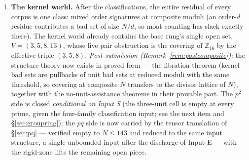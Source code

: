 \documentclass[11pt,a4paper]{article}
\numberwithin{equation}{section}
\theoremstyle{plain}
\theoremstyle{plain}
\theoremstyle{definition}
\theoremstyle{remark}
\newcommand{\Z}{\mathbb{Z}}
\begin{document}
\begin{enumerate}[leftmargin=1.7em,itemsep=4pt]
\item \textbf{The kernel world.} After the classifications, the entire
  residual of every corpus is one class: mixed order signatures at
  composite moduli (an order-$d$ residue contributes a bad set of size
  $N/d$, so moat counting has slack exactly there). The kernel world
  already contains the base rung's single open set,
  $V=(3,5,8,13)$, whose live pair obstruction is the covering of
  $\Z_{16}$ by the effective triple $(3,5,8)$. \emph{Post-submission
  (Remark~\ref{rem:postcomposite}):} the structure theory now exists in
  proved form --- the fibration theorem (kernel bad sets are pullbacks of
  unit bad sets at reduced moduli with the same threshold, so covering at
  composite $N$ transfers to the divisor lattice of $N$), together with
  the no-unit-assistance theorems in their provable part. The $p^2$ side
  is closed \emph{conditional on Input S} (the three-unit cell is empty
  at every prime, given the four-family classification input; see
  the next item and \S\ref{sec:groupring}); the $pq$ side is now carried
  by the tensor translation
  of \S\ref{sec:pq} --- verified empty to $N\le143$ and reduced to the
  same input structure, a single unbounded input after the
  discharge of Input E --- with the rigid-zone lifts the remaining open
  piece.


\end{enumerate}
\end{document}
